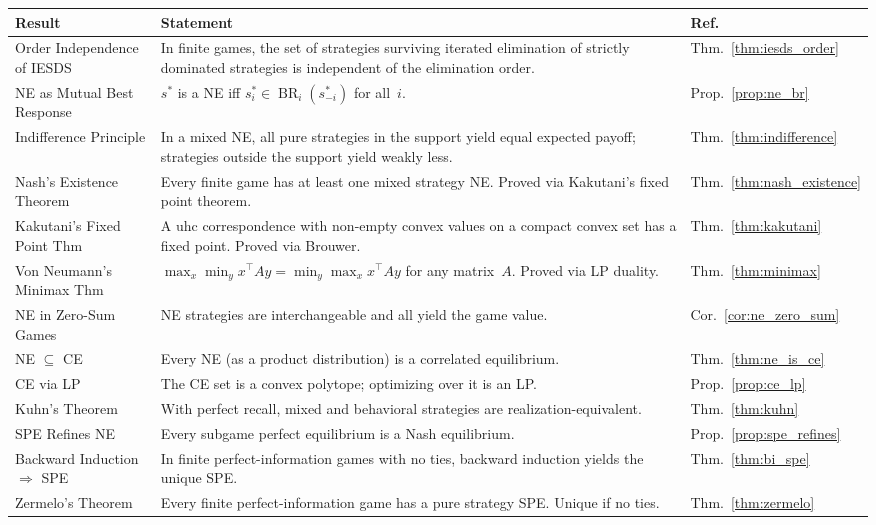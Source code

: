 \documentclass[11pt,a4paper]{article}
\theoremstyle{definition}
\theoremstyle{plain}
\theoremstyle{remark}
\DeclareMathOperator{\BR}{BR}
\begin{document}
\begin{center}
\renewcommand{\arraystretch}{1.4}
\begin{tabular}{p{4.5cm} p{8.5cm} l}
\toprule
\textbf{Result} & \textbf{Statement} & \textbf{Ref.} \\
\midrule
Order Independence of IESDS &
In finite games, the set of strategies surviving iterated elimination of strictly
dominated strategies is independent of the elimination order. &
Thm.~\ref{thm:iesds_order} \\

NE as Mutual Best Response &
$s^*$ is a NE iff $s_i^* \in \BR_i(s_{-i}^*)$ for all~$i$. &
Prop.~\ref{prop:ne_br} \\

Indifference Principle &
In a mixed NE, all pure strategies in the support yield equal expected payoff;
strategies outside the support yield weakly less. &
Thm.~\ref{thm:indifference} \\

Nash's Existence Theorem &
Every finite game has at least one mixed strategy NE.
Proved via Kakutani's fixed point theorem. &
Thm.~\ref{thm:nash_existence} \\

Kakutani's Fixed Point Thm &
A uhc correspondence with non-empty convex values on a compact convex set
has a fixed point. Proved via Brouwer. &
Thm.~\ref{thm:kakutani} \\

Von Neumann's Minimax Thm &
$\max_x \min_y x^\top A y = \min_y \max_x x^\top A y$ for any matrix~$A$.
Proved via LP duality. &
Thm.~\ref{thm:minimax} \\

NE in Zero-Sum Games &
NE strategies are interchangeable and all yield the game value. &
Cor.~\ref{cor:ne_zero_sum} \\

NE $\subseteq$ CE &
Every NE (as a product distribution) is a correlated equilibrium. &
Thm.~\ref{thm:ne_is_ce} \\

CE via LP &
The CE set is a convex polytope; optimizing over it is an LP. &
Prop.~\ref{prop:ce_lp} \\

Kuhn's Theorem &
With perfect recall, mixed and behavioral strategies are realization-equivalent. &
Thm.~\ref{thm:kuhn} \\

SPE Refines NE &
Every subgame perfect equilibrium is a Nash equilibrium. &
Prop.~\ref{prop:spe_refines} \\

Backward Induction $\Rightarrow$ SPE &
In finite perfect-information games with no ties, backward induction yields
the unique SPE. &
Thm.~\ref{thm:bi_spe} \\

Zermelo's Theorem &
Every finite perfect-information game has a pure strategy SPE.
Unique if no ties. &
Thm.~\ref{thm:zermelo} \\
\bottomrule
\end{tabular}
\end{center}
\end{document}
